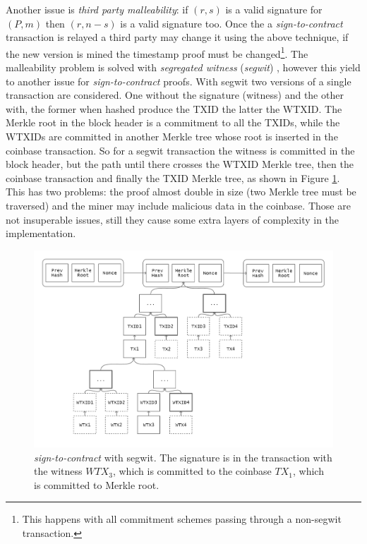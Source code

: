 Another issue is \textit{third party malleability}:
if $(r,s)$ is a valid signature for $(P,m)$ then $(r,n-s)$ is a valid signature too. Once the a \textit{sign-to-contract} transaction is relayed a third party may change it using the above technique, if the new version is mined the timestamp proof must be changed\footnote{This happens with all commitment schemes passing through a non-segwit transaction.}.
The malleability problem is solved with \textit{segregated witness} (\textit{segwit}) \cite{BIP141}, however this yield to another issue for \textit{sign-to-contract} proofs.
With segwit two versions of a single transaction are considered. One without the signature (witness) and the other with, the former when hashed produce the TXID the latter the WTXID.
The Merkle root in the block header is a commitment to all the TXIDs, while the WTXIDs are committed in another Merkle tree whose root is inserted in the coinbase transaction. So for a segwit transaction the witness is committed in the block header, but the path until there crosses the WTXID Merkle tree, then the coinbase transaction and finally the TXID Merkle tree, as shown in Figure \ref{fig:s2c-segwit}. 
This has two problems: the proof almost double in size (two Merkle tree must be traversed) and the miner may include malicious data in the coinbase. Those are not insuperable issues, still they cause some extra layers of complexity in the implementation.

\begin{figure}
	\begin{center}
		\includegraphics[width=\linewidth]{Images/bitcoin-chain-s2c-segwit.png}
		\caption[\textit{sign-to-contract} with segwit.]{\textit{sign-to-contract} with segwit. The signature is in the transaction with the witness $WTX_3$, which is committed to the coinbase $TX_1$, which is committed to Merkle root.}
		\label{fig:s2c-segwit}
	\end{center}
\end{figure} 


